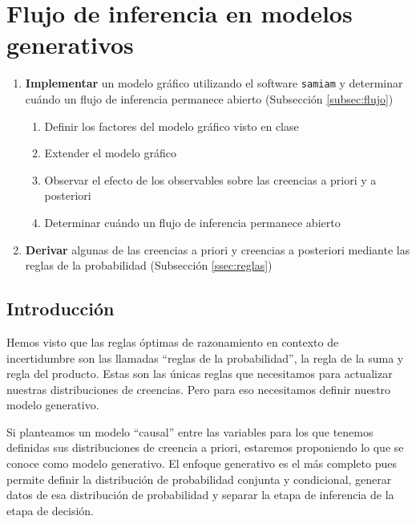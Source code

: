 \section{Flujo de inferencia en modelos generativos} \label{sec:flujo}

 \begin{framed}
 \begin{enumerate}
  \item \textbf{Implementar} un modelo gr\'afico utilizando el software \texttt{samiam} y determinar cuándo un flujo de inferencia permanece abierto (Subsecci\'on \ref{subsec:flujo})
  \begin{enumerate}[i]
  \item Definir los factores del modelo gr\'afico visto en clase
  \item Extender el modelo gr\'afico
  \item Observar el efecto de los observables sobre las creencias a priori y a posteriori
  \item Determinar cu\'ando un flujo de inferencia permanece abierto
 \end{enumerate}
  \item \textbf{Derivar} algunas de las creencias a priori y creencias a posteriori mediante las reglas de la probabilidad (Subsecci\'on \ref{ssec:reglas})
 \end{enumerate}
 \end{framed}
 
\subsection{Introducci\'on}

Hemos visto que las reglas \'optimas de razonamiento en contexto de incertidumbre son las llamadas ``reglas de la probabilidad'', la regla de la suma y regla del producto.
Estas son las \'unicas reglas que necesitamos para actualizar nuestras distribuciones de creencias.
Pero para eso necesitamos definir nuestro modelo generativo.

Si planteamos un modelo ``causal'' entre las variables para los que tenemos definidas sus distribuciones de creencia a priori, estaremos proponiendo lo que se conoce como modelo generativo.
El enfoque generativo es el m\'as completo pues permite definir la distribuci\'on de probabilidad conjunta y condicional, generar datos de esa distribuci\'on de probabilidad y separar la etapa de inferencia de la etapa de decisi\'on.



